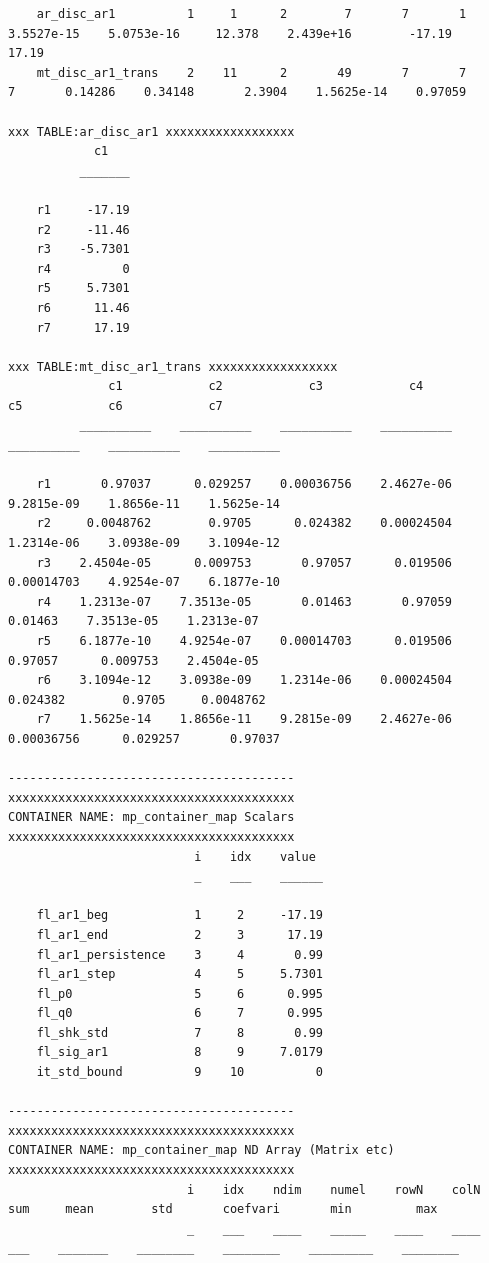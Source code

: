 \documentclass[
]{book}
\begin{document}
\begin{verbatim}
    ar_disc_ar1          1     1      2        7       7       1      3.5527e-15    5.0753e-16     12.378    2.439e+16        -17.19      17.19
    mt_disc_ar1_trans    2    11      2       49       7       7               7       0.14286    0.34148       2.3904    1.5625e-14    0.97059

xxx TABLE:ar_disc_ar1 xxxxxxxxxxxxxxxxxx
            c1   
          _______

    r1     -17.19
    r2     -11.46
    r3    -5.7301
    r4          0
    r5     5.7301
    r6      11.46
    r7      17.19

xxx TABLE:mt_disc_ar1_trans xxxxxxxxxxxxxxxxxx
              c1            c2            c3            c4            c5            c6            c7    
          __________    __________    __________    __________    __________    __________    __________

    r1       0.97037      0.029257    0.00036756    2.4627e-06    9.2815e-09    1.8656e-11    1.5625e-14
    r2     0.0048762        0.9705      0.024382    0.00024504    1.2314e-06    3.0938e-09    3.1094e-12
    r3    2.4504e-05      0.009753       0.97057      0.019506    0.00014703    4.9254e-07    6.1877e-10
    r4    1.2313e-07    7.3513e-05       0.01463       0.97059       0.01463    7.3513e-05    1.2313e-07
    r5    6.1877e-10    4.9254e-07    0.00014703      0.019506       0.97057      0.009753    2.4504e-05
    r6    3.1094e-12    3.0938e-09    1.2314e-06    0.00024504      0.024382        0.9705     0.0048762
    r7    1.5625e-14    1.8656e-11    9.2815e-09    2.4627e-06    0.00036756      0.029257       0.97037

----------------------------------------
xxxxxxxxxxxxxxxxxxxxxxxxxxxxxxxxxxxxxxxx
CONTAINER NAME: mp_container_map Scalars
xxxxxxxxxxxxxxxxxxxxxxxxxxxxxxxxxxxxxxxx
                          i    idx    value 
                          _    ___    ______

    fl_ar1_beg            1     2     -17.19
    fl_ar1_end            2     3      17.19
    fl_ar1_persistence    3     4       0.99
    fl_ar1_step           4     5     5.7301
    fl_p0                 5     6      0.995
    fl_q0                 6     7      0.995
    fl_shk_std            7     8       0.99
    fl_sig_ar1            8     9     7.0179
    it_std_bound          9    10          0

----------------------------------------
xxxxxxxxxxxxxxxxxxxxxxxxxxxxxxxxxxxxxxxx
CONTAINER NAME: mp_container_map ND Array (Matrix etc)
xxxxxxxxxxxxxxxxxxxxxxxxxxxxxxxxxxxxxxxx
                         i    idx    ndim    numel    rowN    colN    sum     mean        std       coefvari       min         max   
                         _    ___    ____    _____    ____    ____    ___    _______    ________    ________    _________    ________


\end{verbatim}
\end{document}
